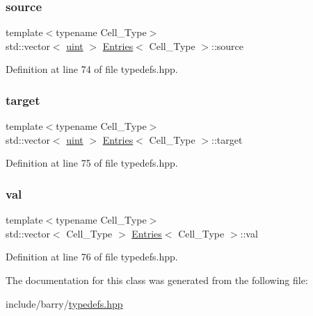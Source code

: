 \subsubsection{\texorpdfstring{source}{source}}
{\footnotesize\ttfamily template$<$typename Cell\+\_\+\+Type$>$ \\
std\+::vector$<$ \hyperlink{typedefs_8hpp_a91ad9478d81a7aaf2593e8d9c3d06a14}{uint} $>$ \hyperlink{class_entries}{Entries}$<$ Cell\+\_\+\+Type $>$\+::source}



Definition at line 74 of file typedefs.\+hpp.

\mbox{\label{class_entries_a02dad3917fa68044b9ea9c60b2909fd7}} 
\subsubsection{\texorpdfstring{target}{target}}
{\footnotesize\ttfamily template$<$typename Cell\+\_\+\+Type$>$ \\
std\+::vector$<$ \hyperlink{typedefs_8hpp_a91ad9478d81a7aaf2593e8d9c3d06a14}{uint} $>$ \hyperlink{class_entries}{Entries}$<$ Cell\+\_\+\+Type $>$\+::target}



Definition at line 75 of file typedefs.\+hpp.

\mbox{\label{class_entries_ae0726e20b17868665cdae6ff70f93bb4}} 
\subsubsection{\texorpdfstring{val}{val}}
{\footnotesize\ttfamily template$<$typename Cell\+\_\+\+Type$>$ \\
std\+::vector$<$ Cell\+\_\+\+Type $>$ \hyperlink{class_entries}{Entries}$<$ Cell\+\_\+\+Type $>$\+::val}



Definition at line 76 of file typedefs.\+hpp.



The documentation for this class was generated from the following file\+:\begin{DoxyCompactItemize}
\item 
include/barry/\hyperlink{typedefs_8hpp}{typedefs.\+hpp}\end{DoxyCompactItemize}
